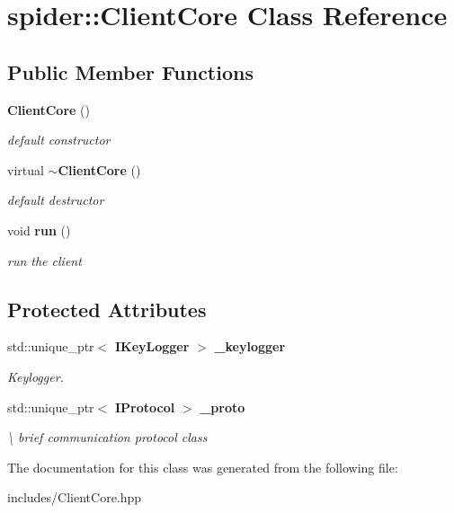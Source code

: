 \section{spider\+:\+:Client\+Core Class Reference}
\label{classspider_1_1_client_core}
\subsection*{Public Member Functions}
\begin{DoxyCompactItemize}
\item 
\mbox{\label{classspider_1_1_client_core_af4477203892593d4739108be682a9089}} 
\textbf{ Client\+Core} ()
\begin{DoxyCompactList}\small\item\em default constructor \end{DoxyCompactList}\item 
\mbox{\label{classspider_1_1_client_core_a343e0b116ad0fd378fcd940a3e2603ed}} 
virtual \textbf{ $\sim$\+Client\+Core} ()
\begin{DoxyCompactList}\small\item\em default destructor \end{DoxyCompactList}\item 
\mbox{\label{classspider_1_1_client_core_aeffcae3283afd9c29a34f7a66aef2396}} 
void \textbf{ run} ()
\begin{DoxyCompactList}\small\item\em run the client \end{DoxyCompactList}\end{DoxyCompactItemize}
\subsection*{Protected Attributes}
\begin{DoxyCompactItemize}
\item 
\mbox{\label{classspider_1_1_client_core_a43e5af78b702c6856b96275e684366ca}} 
std\+::unique\+\_\+ptr$<$ \textbf{ I\+Key\+Logger} $>$ \textbf{ \+\_\+keylogger}
\begin{DoxyCompactList}\small\item\em Keylogger. \end{DoxyCompactList}\item 
\mbox{\label{classspider_1_1_client_core_af8ab6888457938369c77c0901697770b}} 
std\+::unique\+\_\+ptr$<$ \textbf{ I\+Protocol} $>$ \textbf{ \+\_\+proto}
\begin{DoxyCompactList}\small\item\em \textbackslash{} brief communication protocol class \end{DoxyCompactList}\end{DoxyCompactItemize}


The documentation for this class was generated from the following file\+:\begin{DoxyCompactItemize}
\item 
includes/Client\+Core.\+hpp\end{DoxyCompactItemize}

